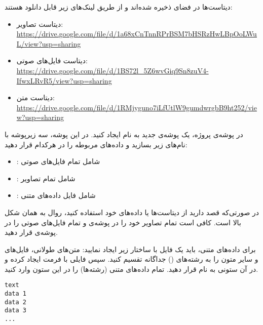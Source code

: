 \documentclass{article}
\begin{document}
دیتاست‌ها در فضای  ذخیره شده‌اند و از طریق لینک‌های زیر قابل دانلود هستند:

\begin{itemize}
    \item دیتاست تصاویر: \\ \href{https://drive.google.com/file/d/1a68xCnTnnRPrBSM7bHSRzHwLBpOoLWuL/view?usp=sharing}{\url{https://drive.google.com/file/d/1a68xCnTnnRPrBSM7bHSRzHwLBpOoLWuL/view?usp=sharing}}
    \item دیتاست فایل‌های صوتی: \\ \href{https://drive.google.com/file/d/1BS72l_5Z6wvGiq9Sn8zuV4-IfwxLRvR5/view?usp=sharing}{\url{https://drive.google.com/file/d/1BS72l_5Z6wvGiq9Sn8zuV4-IfwxLRvR5/view?usp=sharing}}
    \item دیتاست متن: \\ \href{https://drive.google.com/file/d/1RMjyguno7iLfUtlW9gumdwrgbB9ht252/view?usp=sharing}{\url{https://drive.google.com/file/d/1RMjyguno7iLfUtlW9gumdwrgbB9ht252/view?usp=sharing}}
\end{itemize}

در پوشه‌ی پروژه، یک پوشه‌ی جدید به نام  ایجاد کنید.  
در این پوشه، سه زیرپوشه با نام‌های زیر بسازید و داده‌های مربوطه را در هرکدام قرار دهید:

\begin{itemize}
    \item {}: شامل تمام فایل‌های صوتی
    \item {}: شامل تمام تصاویر
    \item {}: شامل فایل  داده‌های متنی
\end{itemize}

در صورتی‌که قصد دارید از دیتاست‌ها یا داده‌های خود استفاده کنید، روال به همان شکل بالا است.  
کافی است تمام تصاویر خود را در پوشه‌ی  و تمام فایل‌های صوتی را در پوشه‌ی  قرار دهید.

برای داده‌های متنی، باید یک فایل  با ساختار زیر ایجاد نمایید:  
متن‌های طولانی، فایل‌های  و سایر متون را به رشته‌های () جداگانه تقسیم کنید.  
سپس فایلی با فرمت  ایجاد کرده و در آن ستونی به نام  قرار دهید.  
تمام داده‌های متنی (رشته‌ها) را در این ستون وارد کنید.

\begin{latin}
\begin{lstlisting}
text
data 1
data 2
data 3
...
\end{lstlisting}
\end{latin}
\end{document}
